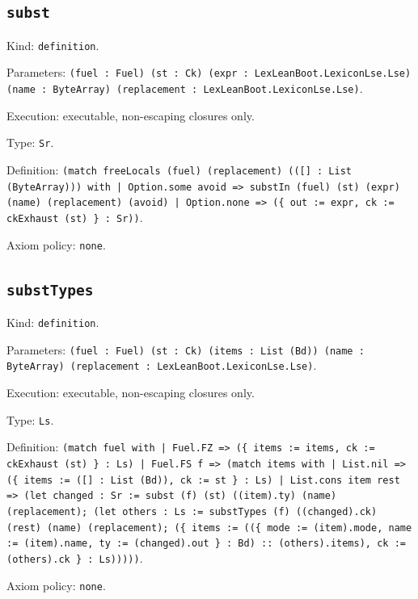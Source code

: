 \documentclass[11pt]{article}
\begin{document}
\subsection*{\texttt{subst}}
\noindent Kind: \texttt{definition}.\par
\noindent Parameters: \texttt{(fuel : Fuel) (st : Ck) (expr : LexLeanBoot.LexiconLse.Lse) (name : ByteArray) (replacement : LexLeanBoot.LexiconLse.Lse)}.\par
\noindent Execution: executable, non-escaping closures only.\par
\noindent Type: \texttt{Sr}.\par
\noindent Definition: \texttt{(match freeLocals (fuel) (replacement) (([] : List (ByteArray))) with | Option.some avoid => substIn (fuel) (st) (expr) (name) (replacement) (avoid) | Option.none => (\{ out := expr, ck := ckExhaust (st) \} : Sr))}.\par
\noindent Axiom policy: \texttt{none}.\par
\subsection*{\texttt{substTypes}}
\noindent Kind: \texttt{definition}.\par
\noindent Parameters: \texttt{(fuel : Fuel) (st : Ck) (items : List (Bd)) (name : ByteArray) (replacement : LexLeanBoot.LexiconLse.Lse)}.\par
\noindent Execution: executable, non-escaping closures only.\par
\noindent Type: \texttt{Ls}.\par
\noindent Definition: \texttt{(match fuel with | Fuel.FZ => (\{ items := items, ck := ckExhaust (st) \} : Ls) | Fuel.FS f => (match items with | List.nil => (\{ items := ([] : List (Bd)), ck := st \} : Ls) | List.cons item rest => (let changed : Sr := subst (f) (st) ((item).ty) (name) (replacement); (let others : Ls := substTypes (f) ((changed).ck) (rest) (name) (replacement); (\{ items := ((\{ mode := (item).mode, name := (item).name, ty := (changed).out \} : Bd) :: (others).items), ck := (others).ck \} : Ls)))))}.\par
\noindent Axiom policy: \texttt{none}.\par
\end{document}
